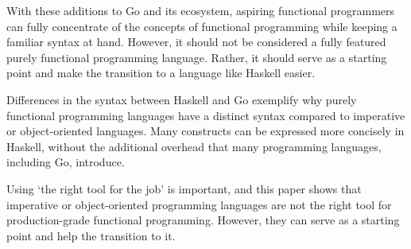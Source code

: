 With these additions to Go and its ecosystem, aspiring functional programmers
can fully concentrate of the concepts of functional programming while keeping
a familiar syntax at hand. However, it should not be considered a fully featured
purely functional programming language. Rather, it should serve as a starting point and
make the transition to a language like Haskell easier.

Differences in the syntax between Haskell and Go exemplify why purely functional programming
languages have a distinct syntax compared to imperative or object-oriented languages.
Many constructs can be expressed more concisely in Haskell, without the additional
overhead that many programming languages, including Go, introduce.

Using `the right tool for the job' is important, and this paper shows that imperative or
object-oriented programming languages are not the right tool for production-grade
functional programming. However, they can serve as a starting point and help the
transition to it.
